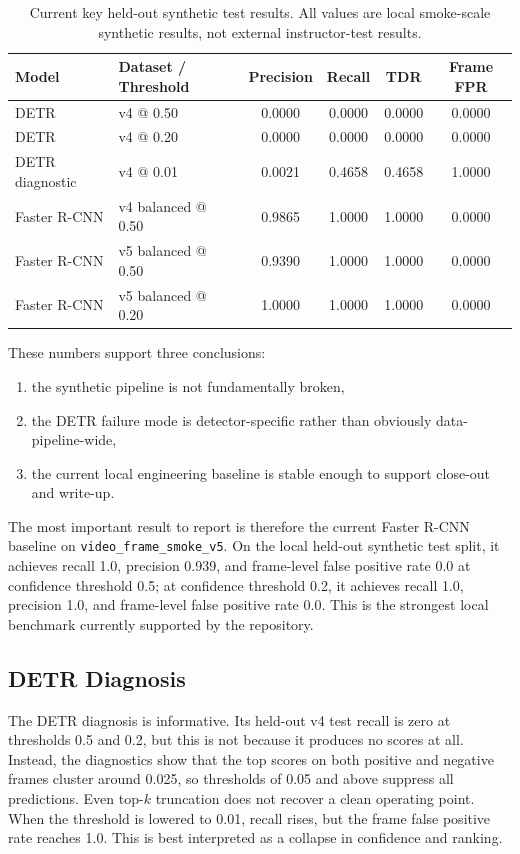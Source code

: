 \documentclass[11pt]{article}
\begin{document}
\begin{table}[H]
    \centering
    \caption{Current key held-out synthetic test results. All values are local smoke-scale synthetic results, not external instructor-test results.}
    \begin{tabular}{llcccc}
        \toprule
        Model & Dataset / Threshold & Precision & Recall & TDR & Frame FPR \\
        \midrule
        DETR & v4 @ 0.50 & 0.0000 & 0.0000 & 0.0000 & 0.0000 \\
        DETR & v4 @ 0.20 & 0.0000 & 0.0000 & 0.0000 & 0.0000 \\
        DETR diagnostic & v4 @ 0.01 & 0.0021 & 0.4658 & 0.4658 & 1.0000 \\
        Faster R-CNN & v4 balanced @ 0.50 & 0.9865 & 1.0000 & 1.0000 & 0.0000 \\
        Faster R-CNN & v5 balanced @ 0.50 & 0.9390 & 1.0000 & 1.0000 & 0.0000 \\
        Faster R-CNN & v5 balanced @ 0.20 & 1.0000 & 1.0000 & 1.0000 & 0.0000 \\
        \bottomrule
    \end{tabular}
\end{table}

These numbers support three conclusions:
\begin{enumerate}[leftmargin=1.5em]
    \item the synthetic pipeline is not fundamentally broken,
    \item the DETR failure mode is detector-specific rather than obviously data-pipeline-wide,
    \item the current local engineering baseline is stable enough to support close-out and write-up.
\end{enumerate}

The most important result to report is therefore the current Faster R-CNN baseline on \texttt{video\_frame\_smoke\_v5}. On the local held-out synthetic test split, it achieves recall 1.0, precision 0.939, and frame-level false positive rate 0.0 at confidence threshold 0.5; at confidence threshold 0.2, it achieves recall 1.0, precision 1.0, and frame-level false positive rate 0.0. This is the strongest local benchmark currently supported by the repository.

\subsection{DETR Diagnosis}
The DETR diagnosis is informative. Its held-out v4 test recall is zero at thresholds 0.5 and 0.2, but this is not because it produces no scores at all. Instead, the diagnostics show that the top scores on both positive and negative frames cluster around 0.025, so thresholds of 0.05 and above suppress all predictions. Even top-$k$ truncation does not recover a clean operating point. When the threshold is lowered to 0.01, recall rises, but the frame false positive rate reaches 1.0. This is best interpreted as a collapse in confidence and ranking.
\end{document}

